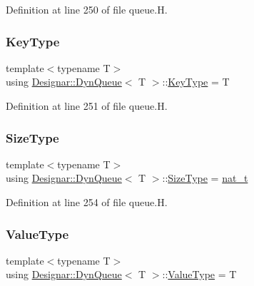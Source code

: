 Definition at line 250 of file queue.\+H.

\mbox{\label{class_designar_1_1_dyn_queue_a0591681d66d914b3fb11f71d36759984}} 
\subsubsection{\texorpdfstring{Key\+Type}{KeyType}}
{\footnotesize\ttfamily template$<$typename T$>$ \\
using \hyperlink{class_designar_1_1_dyn_queue}{Designar\+::\+Dyn\+Queue}$<$ T $>$\+::\hyperlink{class_designar_1_1_fixed_array_a3a725cf21783340b8aca29dd1db0acf0}{Key\+Type} =  T}



Definition at line 251 of file queue.\+H.

\mbox{\label{class_designar_1_1_dyn_queue_a376b5cd2f4a47d734fc1e73955197358}} 
\subsubsection{\texorpdfstring{Size\+Type}{SizeType}}
{\footnotesize\ttfamily template$<$typename T$>$ \\
using \hyperlink{class_designar_1_1_dyn_queue}{Designar\+::\+Dyn\+Queue}$<$ T $>$\+::\hyperlink{class_designar_1_1_fixed_array_a503ae414cc313d248e77c08e62ef043c}{Size\+Type} =  \hyperlink{namespace_designar_aa72662848b9f4815e7bf31a7cf3e33d1}{nat\+\_\+t}}



Definition at line 254 of file queue.\+H.

\mbox{\label{class_designar_1_1_dyn_queue_a6528f67f5ad9ecbe0f8a21b88f3cb832}} 
\subsubsection{\texorpdfstring{Value\+Type}{ValueType}}
{\footnotesize\ttfamily template$<$typename T$>$ \\
using \hyperlink{class_designar_1_1_dyn_queue}{Designar\+::\+Dyn\+Queue}$<$ T $>$\+::\hyperlink{class_designar_1_1_fixed_array_ac1cfeb4403a2dcbffd7ef494e5b873d0}{Value\+Type} =  T}



